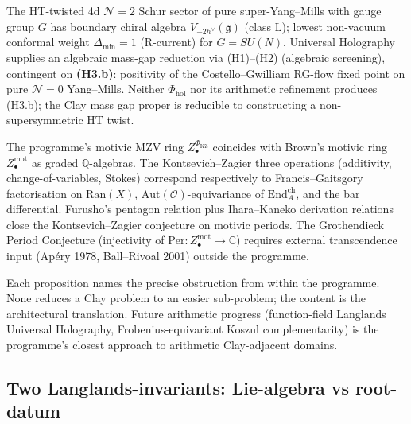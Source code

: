 \documentclass[11pt]{article}
\begin{document}
\begin{proposition}
\label{prop:ym-reformulated}
The HT-twisted 4d $\mathcal{N} = 2$ Schur sector of pure
super-Yang--Mills with gauge group $G$ has boundary chiral algebra
$V_{-2h^{\vee}}(\mathfrak{g})$ (class L); lowest non-vacuum conformal
weight $\Delta_{\min} = 1$ (R-current) for $G = SU(N)$. Universal
Holography supplies an algebraic mass-gap reduction via
(H1)--(H2) (algebraic screening), contingent on
\textbf{(H3.b)}: positivity of the Costello--Gwilliam RG-flow fixed
point on pure $\mathcal{N} = 0$ Yang--Mills. Neither $\Phi_{\mathrm{hol}}$
nor its arithmetic refinement produces (H3.b); the Clay mass gap
proper is reducible to constructing a non-supersymmetric HT twist.
\end{proposition}

\begin{proposition}
\label{prop:gpc-reformulated}
The programme's motivic MZV ring
$Z_{\bullet}^{\Phi_{\mathrm{KZ}}}$ coincides with Brown's motivic ring
$Z_{\bullet}^{\mathrm{mot}}$ as graded $\mathbb{Q}$-algebras. The
Kontsevich--Zagier three operations (additivity, change-of-variables,
Stokes) correspond respectively to Francis--Gaitsgory factorisation
on $\mathrm{Ran}(X)$, $\mathrm{Aut}(\mathcal{O})$-equivariance of
$\mathrm{End}^{\mathrm{ch}}_A$, and the bar differential. Furusho's
pentagon relation plus Ihara--Kaneko derivation relations close the
Kontsevich--Zagier conjecture on motivic periods. The Grothendieck
Period Conjecture (injectivity of
$\mathrm{Per} : Z_{\bullet}^{\mathrm{mot}} \to \mathbb{C}$) requires
external transcendence input (Apéry 1978, Ball--Rivoal 2001) outside
the programme.
\end{proposition}

\begin{remark}
Each proposition names the precise obstruction from within the
programme. None reduces a Clay problem to an easier sub-problem; the
content is the architectural translation. Future arithmetic progress
(function-field Langlands Universal Holography, Frobenius-equivariant
Koszul complementarity) is the programme's closest approach to
arithmetic Clay-adjacent domains.
\end{remark}

\subsection{Two Langlands-invariants: Lie-algebra vs root-datum}
\label{subsec:langlands-two-invariants}
\end{document}
